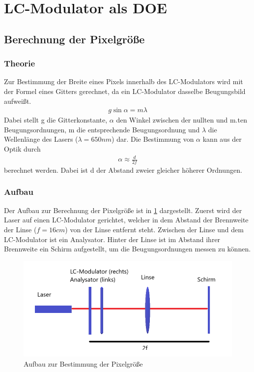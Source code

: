 \section{LC-Modulator als DOE}
\subsection{Berechnung der Pixelgröße}
\subsubsection{Theorie}
Zur Bestimmung der Breite eines Pixels innerhalb des LC-Modulators wird mit der Formel eines Gitters gerechnet, da ein LC-Modulator dasselbe Beugungsbild aufweißt.
\begin{align}
	g\sin{\alpha} = m\lambda
	\label{gbestimm}
\end{align}
Dabei stellt g die Gitterkonstante, $\alpha$ den Winkel zwischen der nullten und m.ten Beugungsordnungen, m die entsprechende Beugungsordnung und $\lambda$ die Wellenlänge des Lasers ($\lambda = 650nm$) dar.
Die Bestimmung von $\alpha$ kann aus der Optik durch
\begin{align}
	\alpha \approx \frac{d}{2f}
	\label{abestimm}
\end{align}
berechnet werden. Dabei ist d der Abstand zweier gleicher höherer Ordnungen. 
\subsubsection{Aufbau}
Der Aufbau zur Berechnung der Pixelgröße ist in \cref{421} dargestellt.
Zuerst wird der Laser auf einen LC-Modulator gerichtet, welcher in dem Abstand der Brennweite der Linse ($f = 16cm$) von der Linse entfernt steht. Zwischen der Linse und dem LC-Modulator ist ein Analysator. Hinter der Linse ist im Abstand ihrer Brennweite ein Schirm aufgestellt, um die Beugungsordnungen messen zu können. 
\begin{figure}[h!]
	\centering
	\includegraphics[scale = 1]{4.2.1-Aufbau.png}
	\caption{Aufbau zur Bestimmung der Pixelgröße}
	\label{421}
\end{figure}
